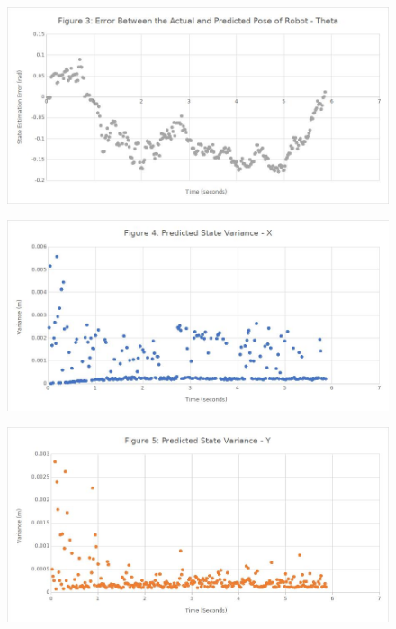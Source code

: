 \documentclass[journal]{IEEEtran}
\begin{document}
\begin{figure}[!t]%
\centering
\includegraphics[width=0.9\linewidth]{Figures/3-actual-predicted-error-theta.jpg}
\caption{}
\label{fig:3}
\end{figure}

\begin{figure}[!t]%
\centering
\includegraphics[width=0.9\linewidth]{Figures/4-pred-state-var-x.jpg}
\caption{}
\label{fig:4}
\end{figure}

\begin{figure}[!t]%
\centering
\includegraphics[width=0.9\linewidth]{Figures/5-pred-state-var-y.jpg}
\caption{}
\label{fig:5}
\end{figure}
\end{document}
